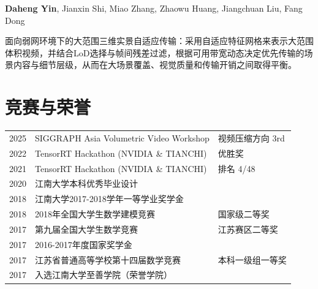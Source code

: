 \documentclass[]{deedy-resume-openfont}
\begin{document}
\begin{minipage}[t]{0.75\textwidth}
\begin{tightemize}
  \item \textbf{Daheng Yin}, Jianxin Shi, Miao Zhang, Zhaowu Huang, Jiangchuan Liu, Fang Dong
  \item 面向弱网环境下的大范围三维实景自适应传输：采用自适应特征网格来表示大范围体积视频，并结合LoD选择与帧间残差过滤，根据可用带宽动态决定优先传输的场景内容与细节层级，从而在大场景覆盖、视觉质量和传输开销之间取得平衡。
\end{tightemize}

\section{竞赛与荣誉}
\begin{tabular}{lll}
2025 & SIGGRAPH Asia Volumetric Video Workshop & 视频压缩方向 3rd \\
2022 & TensorRT Hackathon (NVIDIA \& TIANCHI) & 优胜奖 \\
2021 & TensorRT Hackathon (NVIDIA \& TIANCHI) & 排名 4/48 \\
2020 & 江南大学本科优秀毕业设计 & \\
2018 & 江南大学2017-2018学年一等学业奖学金 &  \\
2018 & 2018年全国大学生数学建模竞赛 & 国家级二等奖 \\
2017 & 第九届全国大学生数学竞赛 & 江苏赛区二等奖 \\
2017 & 2016-2017年度国家奖学金 & \\
2017 & 江苏省普通高等学校第十四届数学竞赛 & 本科一级组一等奖 \\
2017 & 入选江南大学至善学院（荣誉学院）& \\
\end{tabular}

\end{minipage}
\end{document}
